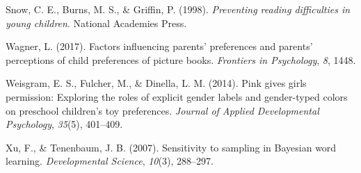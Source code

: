 \documentclass[
  english,
  ,man,floatsintext]{apa6}
\begin{document}
\leavevmode\hypertarget{ref-snow1998preventing}{}%
Snow, C. E., Burns, M. S., \& Griffin, P. (1998). \emph{Preventing reading difficulties in young children}. National Academies Press.

\leavevmode\hypertarget{ref-wagner2017factors}{}%
Wagner, L. (2017). Factors influencing parents' preferences and parents' perceptions of child preferences of picture books. \emph{Frontiers in Psychology}, \emph{8}, 1448.

\leavevmode\hypertarget{ref-weisgram2014pink}{}%
Weisgram, E. S., Fulcher, M., \& Dinella, L. M. (2014). Pink gives girls permission: Exploring the roles of explicit gender labels and gender-typed colors on preschool children's toy preferences. \emph{Journal of Applied Developmental Psychology}, \emph{35}(5), 401--409.

\leavevmode\hypertarget{ref-xu2007b}{}%
Xu, F., \& Tenenbaum, J. B. (2007). Sensitivity to sampling in Bayesian word learning. \emph{Developmental Science}, \emph{10}(3), 288--297.
\end{document}
